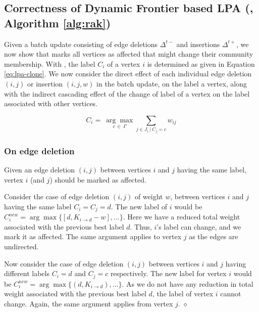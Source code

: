 \subsection{Correctness of Dynamic Frontier based LPA (\FroLPA{}, Algorithm \ref{alg:rak})}
\label{sec:lpa-correctness}

Given a batch update consisting of edge deletions $\Delta^{t-}$ and insertions $\Delta^{t+}$, we now show that \FroLPA{} marks all vertices as affected that might change their community membership. With \LPA{}, the label $C_i$ of a vertex $i$ is determined as given in Equation \ref{eq:lpa-clone}. We now consider the direct effect of each individual edge deletion $(i, j)$ or insertion $(i, j, w)$ in the batch update, on the label a vertex, along with the indirect cascading effect of the change of label of a vertex on the label associated with other vertices.

\begin{equation}
\label{eq:lpa-clone}
  C_i =\ \underset{c\ \in \ \Gamma}{\arg\max} { \sum_{j \in J_i\ |\ C_j = c} w_{ij} }
\end{equation}




\subsubsection{On edge deletion}

\begin{lemma}
\label{thm:lpa--mark-deletion}
Given an edge deletion $(i, j)$ between vertices $i$ and $j$ having the same label, vertex $i$ (and $j$) should be marked as affected.
\end{lemma}

Consider the case of edge deletion $(i, j)$ of weight $w$, between vertices $i$ and $j$ having the same label $C_i = C_j = d$. The new label of $i$ would be $C_i^{new} = \arg\max \{ [d, K_{i \rightarrow d} - w], ... \}$. Here we have a reduced total weight associated with the previous best label $d$. Thus, $i$'s label can change, and we mark it as affected. The same argument applies to vertex $j$ as the edges are undirected.

Now consider the case of edge deletion $(i, j)$ between vertices $i$ and $j$ having different labels $C_i = d$ and $C_j = c$ respectively. The new label for vertex $i$ would be $C_i^{new} = \arg\max \{ (d, K_{i \rightarrow d}), ... \}$. As we do not have any reduction in total weight associated with the previous best label $d$, the label of vertex $i$ cannot change. Again, the same argument applies from vertex $j$. \hfill $\diamond$




